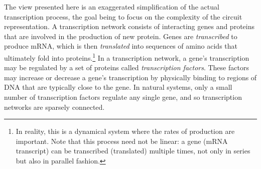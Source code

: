 \documentclass{acmtr2e}
\begin{document}
The view presented here is an exaggerated simplification of the actual
transcription process, the goal being to focus on the complexity of the circuit
representation. A transcription network consists of 
interacting genes and proteins that are involved in the production of new
protein. Genes are \emph{transcribed} to produce mRNA, which is then
\emph{translated} into sequences of amino acids that ultimately fold into
proteins.\footnote{In reality, this is a dynamical system where the rates of
production are important. Note that this process need not be linear: a gene (mRNA
transcript) can be transcribed (translated) multiple times, not only in series
but also in parallel fashion.}
In a transcription network, a gene's transcription may be regulated by a set of
proteins called \emph{transcription factors}.
These factors may increase or decrease a gene's transcription by
physically binding to regions of DNA that are typically close to the gene.
In natural systems, only a small number of transcription factors
regulate any single gene, and so transcription networks are sparsely connected.
\end{document}

